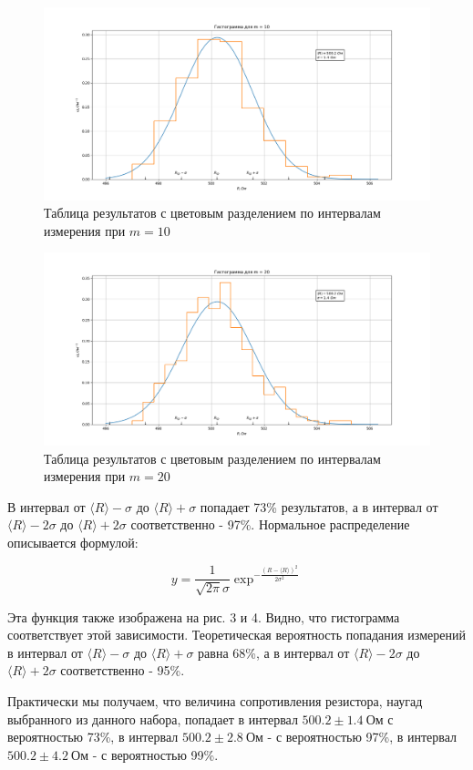 \documentclass[a4paper, 12pt]{article}
\begin{document}
    \begin{figure}
        \centering
        \includegraphics[width=1\linewidth]{m10.png}
        \caption{Таблица результатов с цветовым разделением по интервалам измерения при $m = 10$}
    \end{figure}
    \begin{figure}
        \centering
        \includegraphics[width=1\linewidth]{m20.png}
        \caption{Таблица результатов с цветовым разделением по интервалам измерения при $m = 20$}
    \end{figure}

    В интервал от $\langle R \rangle - \sigma$ до $\langle R \rangle + \sigma$ попадает 73\% результатов, а в интервал от $\langle R \rangle - 2\sigma$ до $\langle R \rangle + 2\sigma$ соответственно - 97\%. Нормальное распределение описывается формулой:

    \begin{equation}
        y = \frac{1}{\sqrt{2 \pi} \sigma} \exp^{- \frac{(R - \langle R \rangle)^2}{2 \sigma^2}}
    \end{equation}

    Эта функция также изображена на рис. 3 и 4. Видно, что гистограмма соответствует этой зависимости. Теоретическая вероятность попадания измерений в интервал от $\langle R \rangle - \sigma$ до $\langle R \rangle + \sigma$ равна 68\%, а в интервал от $\langle R \rangle - 2\sigma$ до $\langle R \rangle + 2\sigma$ соответственно - 95\%.

    Практически мы получаем, что величина сопротивления резистора, наугад выбранного из данного набора, попадает в интервал $500.2 \pm 1.4\ Ом$ с вероятностью 73\%, в интервал $500.2 \pm 2.8\ Ом$ - с вероятностью 97\%, в интервал  $500.2 \pm 4.2\ Ом$ - с вероятностью 99\%.
\end{document}

